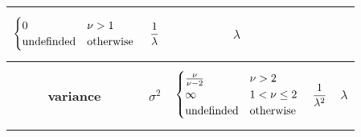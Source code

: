 \documentclass{article}
\begin{document}
\begin{landscape}
\begin{center}
\begin{tabular}{c|c|c|c|c}
{\begin{align}
\begin{cases}
						0 & \nu>1 \\ \text{undefinded} & \text{otherwise}
					\end{cases}\notag
				\end{align}}
				&
				\parbox{3cm}{\begin{align}
					\frac{1}{\lambda}\notag
				\end{align}}
				& 
				$\lambda$
				\\
				\hline
				\textbf{variance} &
				$\sigma^2$
				&
				\parbox{3cm}{\begin{align}
					\begin{cases}
						\frac{\nu}{\nu-2} & \nu>2 \\ \infty & 1<\nu\le 2 \\ \text{undefinded} & \text{otherwise}
					\end{cases} \notag
				\end{align}}
				&
				\parbox{3cm}{\begin{align}
					\frac{1}{\lambda^2}\notag
				\end{align}}
				& 
				$\lambda$
				\\
			\end{tabular}
		\end{center}
	\end{landscape}
	\pagebreak
\end{document}
